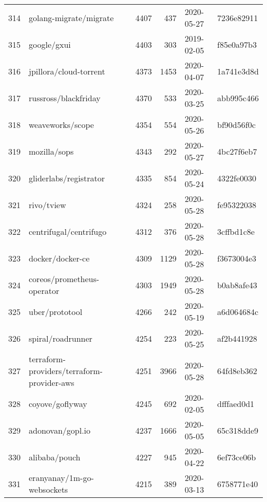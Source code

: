 \begin{longtable}{llrrll}
    314 &                             golang-migrate/migrate &   4407 &    437 & 2020-05-27 &  7236e82911 \\
    315 &                                        google/gxui &   4403 &    303 & 2019-02-05 &  f85e0a97b3 \\
    316 &                             jpillora/cloud-torrent &   4373 &   1453 & 2020-04-07 &  1a741e3d8d \\
    317 &                               russross/blackfriday &   4370 &    533 & 2020-03-25 &  abb995c466 \\
    318 &                                   weaveworks/scope &   4354 &    554 & 2020-05-26 &  bf90d56f0c \\
    319 &                                       mozilla/sops &   4343 &    292 & 2020-05-27 &  4bc27f6eb7 \\
    320 &                             gliderlabs/registrator &   4335 &    854 & 2020-05-24 &  4322fe0030 \\
    321 &                                         rivo/tview &   4324 &    258 & 2020-05-28 &  fe95322038 \\
    322 &                             centrifugal/centrifugo &   4312 &    376 & 2020-05-28 &  3cffbd1c8e \\
    323 &                                   docker/docker-ce &   4309 &   1129 & 2020-05-28 &  f3673004e3 \\
    324 &                         coreos/prometheus-operator &   4303 &   1949 & 2020-05-28 &  b0ab8afe43 \\
    325 &                                     uber/prototool &   4266 &    242 & 2020-05-19 &  a6d064684c \\
    326 &                                  spiral/roadrunner &   4254 &    223 & 2020-05-25 &  af2b441928 \\
    327 &         terraform-providers/terraform-provider-aws &   4251 &   3966 & 2020-05-28 &  64fd8eb362 \\
    328 &                                    coyove/goflyway &   4245 &    692 & 2020-02-05 &  dfffaed0d1 \\
    329 &                                   adonovan/gopl.io &   4237 &   1666 & 2020-05-05 &  65c318dde9 \\
    330 &                                      alibaba/pouch &   4227 &    945 & 2020-04-22 &  6ef73ce06b \\
    331 &                         eranyanay/1m-go-websockets &   4215 &    389 & 2020-03-13 &  6758771e40 \\

\end{longtable}

